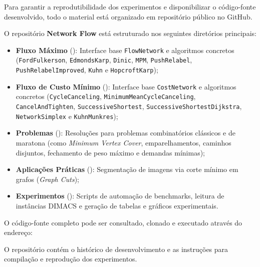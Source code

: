 \newpage

\label{ap:github}

Para garantir a reprodutibilidade dos experimentos e disponibilizar o código-fonte desenvolvido, todo o material está organizado em repositório público no GitHub.

O repositório \textbf{Network Flow} está estruturado nos seguintes diretórios principais:
\begin{itemize}[leftmargin=1.5em, itemsep=0.2em]
\raggedright
    \item \textbf{Fluxo Máximo} (): Interface base \lstinline{FlowNetwork} e algoritmos concretos (\lstinline{FordFulkerson}, \lstinline{EdmondsKarp}, \lstinline{Dinic}, \lstinline{MPM}, \lstinline{PushRelabel}, \lstinline{PushRelabelImproved}, \lstinline{Kuhn} e \lstinline{HopcroftKarp});
    \item \textbf{Fluxo de Custo Mínimo} (): Interface base \lstinline{CostNetwork} e algoritmos concretos (\lstinline{CycleCanceling}, \lstinline{MinimumMeanCycleCanceling}, \lstinline{CancelAndTighten}, \lstinline{SuccessiveShortest}, \lstinline{SuccessiveShortestDijkstra}, \lstinline{NetworkSimplex} e \lstinline{KuhnMunkres});
    \item \textbf{Problemas} (): Resoluções para problemas combinatórios clássicos e de maratona (como \textit{Minimum Vertex Cover}, emparelhamentos, caminhos disjuntos, fechamento de peso máximo e demandas mínimas);
    \item \textbf{Aplicações Práticas} (): Segmentação de imagens via corte mínimo em grafos (\textit{Graph Cuts});
    \item \textbf{Experimentos} (): Scripts de automação de benchmarks, leitura de instâncias DIMACS e geração de tabelas e gráficos experimentais.
\end{itemize}

O código-fonte completo pode ser consultado, clonado e executado através do endereço:

\vspace{0.4cm}
\begin{center}
\end{center}
\vspace{0.4cm}

O repositório contém o histórico de desenvolvimento e as instruções para compilação e reprodução dos experimentos.
